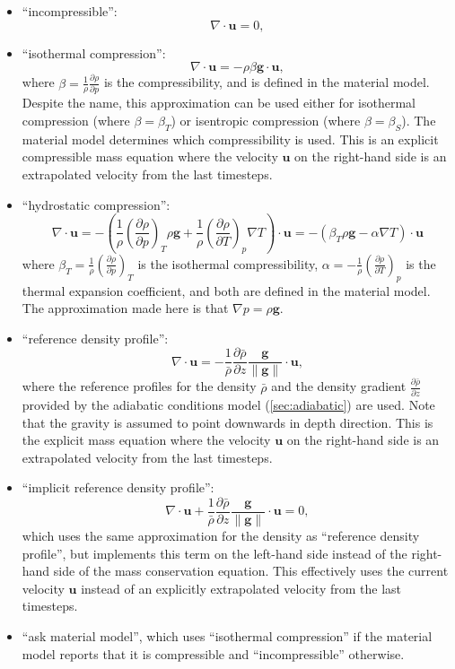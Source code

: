 \documentclass{article}
\begin{document}
\begin{itemize}

\item
``incompressible'':
\[
 \nabla \cdot \textbf{u} = 0,
\]

\item
``isothermal compression'':
\[
 \nabla \cdot \textbf{u} = -\rho \beta \textbf{g} \cdot \textbf{u},
\]
where $\beta = \frac{1}{\rho} \frac{\partial \rho}{\partial p}$ is the compressibility, and
is defined in the material model. Despite the name, this approximation can be used either for
isothermal compression (where $\beta = \beta_T$) or isentropic compression
(where $\beta = \beta_S$). The material model determines which compressibility is used.
This is an explicit compressible mass equation where
the velocity $\textbf{u}$ on the right-hand side is an extrapolated velocity
from the last timesteps.

\item
``hydrostatic compression'':
\[
 \nabla \cdot \textbf{u}
= - \left( \frac{1}{\rho} \left( \frac{\partial \rho}{\partial p} \right)_{T} \rho \textbf{g} + \frac{1}{\rho} \left( \frac{\partial \rho}{\partial T} \right)_{p} \nabla T \right) \cdot \textbf{u}
= - \left( \beta_T \rho \textbf{g} - \alpha \nabla T \right) \cdot \textbf{u}
\]
where $\beta_T = \frac{1}{\rho} \left(\frac{\partial \rho}{\partial p} \right)_{T}$ is the isothermal compressibility,
$\alpha = - \frac{1}{\rho} \left(\frac{\partial \rho}{\partial T} \right)_{p}$ is the
thermal expansion coefficient, and both are defined in the material model. The
approximation made here is that $\nabla p = \rho \textbf{g}$.

\item
``reference density profile'':
\[
 \nabla \cdot \textbf{u} = -\frac{1}{\bar{\rho}} \frac{\partial \bar{\rho}}{\partial z} \frac{\textbf{g}}{\|\textbf{g}\|} \cdot \textbf{u},
\]
where the reference profiles for the density $\bar{\rho}$ and the density gradient $\frac{\partial \bar{\rho}}{\partial z}$
provided by the adiabatic conditions model (\ref{sec:adiabatic})
are used. Note that the gravity is assumed to point downwards in depth direction.
This is the explicit mass equation where the velocity $\textbf{u}$ on the right-hand
side is an extrapolated velocity from the last timesteps.

\item
``implicit reference density profile'':
\[
 \nabla \cdot \textbf{u} + \frac{1}{\bar{\rho}} \frac{\partial \bar{\rho}}{\partial z} \frac{\textbf{g}}{\|\textbf{g}\|} \cdot \textbf{u} = 0,
\]
which uses the same approximation for the density as ``reference density profile'',
but implements this term on the left-hand side instead of the right-hand side of the mass
conservation equation. This effectively uses the current velocity $\textbf{u}$ instead
of an explicitly extrapolated velocity from the last timesteps.

 \item
``ask material model'', which uses ``isothermal compression'' if the material model reports
that it is compressible and ``incompressible'' otherwise.
\end{itemize}
\end{document}
